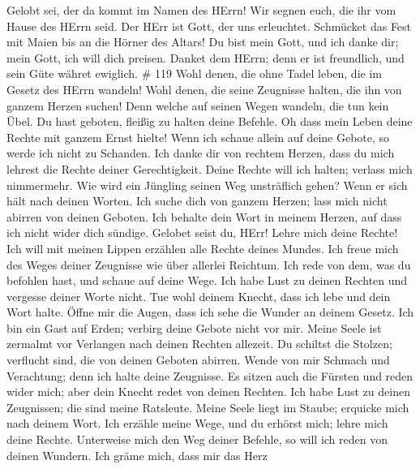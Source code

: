 Gelobt sei, der da kommt im Namen des HErrn! Wir segnen euch, die ihr
vom Hause des HErrn seid.  Der HErr ist Gott, der uns
erleuchtet. Schmücket das Fest mit Maien bis an die Hörner des Altars!
 Du bist mein Gott, und ich danke dir; mein Gott, ich will
dich preisen.  Danket dem HErrn; denn er ist freundlich,
und sein Güte währet ewiglich. \# 119  Wohl denen, die ohne
Tadel leben, die im Gesetz des HErrn wandeln!  Wohl denen,
die seine Zeugnisse halten, die ihn von ganzem Herzen suchen!
 Denn welche auf seinen Wegen wandeln, die tun kein Übel.
 Du hast geboten, fleißig zu halten deine Befehle.
 Oh dass mein Leben deine Rechte mit ganzem Ernst hielte!
 Wenn ich schaue allein auf deine Gebote, so werde ich nicht
zu Schanden.  Ich danke dir von rechtem Herzen, dass du mich
lehrest die Rechte deiner Gerechtigkeit.  Deine Rechte will
ich halten; verlass mich nimmermehr.  Wie wird ein Jüngling
seinen Weg unsträflich gehen? Wenn er sich hält nach deinen Worten.
 Ich suche dich von ganzem Herzen; lass mich nicht abirren
von deinen Geboten.  Ich behalte dein Wort in meinem
Herzen, auf dass ich nicht wider dich sündige.  Gelobet
seist du, HErr! Lehre mich deine Rechte!  Ich will mit
meinen Lippen erzählen alle Rechte deines Mundes.  Ich
freue mich des Weges deiner Zeugnisse wie über allerlei Reichtum.
 Ich rede von dem, was du befohlen hast, und schaue auf
deine Wege.  Ich habe Lust zu deinen Rechten und vergesse
deiner Worte nicht.  Tue wohl deinem Knecht, dass ich lebe
und dein Wort halte.  Öffne mir die Augen, dass ich sehe
die Wunder an deinem Gesetz.  Ich bin ein Gast auf Erden;
verbirg deine Gebote nicht vor mir.  Meine Seele ist
zermalmt vor Verlangen nach deinen Rechten allezeit.  Du
schiltst die Stolzen; verflucht sind, die von deinen Geboten abirren.
 Wende von mir Schmach und Verachtung; denn ich halte deine
Zeugnisse.  Es sitzen auch die Fürsten und reden wider
mich; aber dein Knecht redet von deinen Rechten.  Ich habe
Lust zu deinen Zeugnissen; die sind meine Ratsleute.  Meine
Seele liegt im Staube; erquicke mich nach deinem Wort.  Ich
erzähle meine Wege, und du erhörst mich; lehre mich deine Rechte.
 Unterweise mich den Weg deiner Befehle, so will ich reden
von deinen Wundern.  Ich gräme mich, dass mir das Herz
